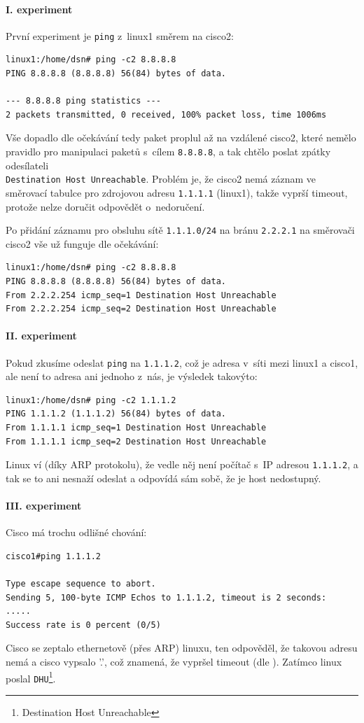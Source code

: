\paragraph{I. experiment}
První experiment je \verb|ping| z~linux1 směrem na cisco2:
\begin{verbatim}
linux1:/home/dsn# ping -c2 8.8.8.8
PING 8.8.8.8 (8.8.8.8) 56(84) bytes of data.

--- 8.8.8.8 ping statistics ---
2 packets transmitted, 0 received, 100% packet loss, time 1006ms
\end{verbatim}

Vše dopadlo dle očekávání tedy paket proplul až na vzdálené cisco2, které nemělo pravidlo pro manipulaci paketů s~cílem \verb|8.8.8.8|, a tak chtělo poslat zpátky odesílateli \\\verb|Destination Host Unreachable|. Problém je, že cisco2 nemá záznam ve směrovací tabulce pro zdrojovou adresu \verb|1.1.1.1| (linux1), takže vyprší timeout, protože nelze doručit odpovědět o~nedoručení.

Po přidání záznamu pro obsluhu sítě \verb|1.1.1.0/24| na bránu \verb|2.2.2.1| na směrovači cisco2 vše už funguje dle očekávání:
\begin{verbatim}
linux1:/home/dsn# ping -c2 8.8.8.8
PING 8.8.8.8 (8.8.8.8) 56(84) bytes of data.
From 2.2.2.254 icmp_seq=1 Destination Host Unreachable
From 2.2.2.254 icmp_seq=2 Destination Host Unreachable
\end{verbatim} 


\paragraph{II. experiment}
Pokud zkusíme odeslat \verb|ping| na \verb|1.1.1.2|, což je adresa v~síti mezi linux1 a cisco1, ale není to adresa ani jednoho z~nás, je výsledek takovýto:
\begin{verbatim}
linux1:/home/dsn# ping -c2 1.1.1.2
PING 1.1.1.2 (1.1.1.2) 56(84) bytes of data.
From 1.1.1.1 icmp_seq=1 Destination Host Unreachable
From 1.1.1.1 icmp_seq=2 Destination Host Unreachable
\end{verbatim} 
Linux ví (díky ARP protokolu), že vedle něj není počítač s~IP adresou \verb|1.1.1.2|, a tak se to ani nesnaží odeslat a odpovídá sám sobě, že je host nedostupný. 


\paragraph{III. experiment}
Cisco má trochu odlišné chování:
\begin{verbatim}
cisco1#ping 1.1.1.2

Type escape sequence to abort.
Sending 5, 100-byte ICMP Echos to 1.1.1.2, timeout is 2 seconds:
.....
Success rate is 0 percent (0/5)
\end{verbatim}
Cisco se zeptalo ethernetově (přes ARP) linuxu, ten odpověděl, že takovou adresu nemá a cisco vypsalo '.', což znamená, že vypršel timeout (dle \cite{cisco:icmp_codes}). Zatímco linux poslal \verb|DHU|\footnote{Destination Host Unreachable}.

